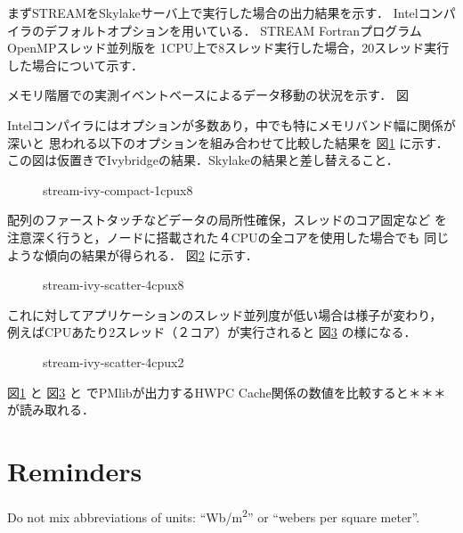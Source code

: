 \documentclass[conference]{IEEEtran}
\begin{document}
まずSTREAMをSkylakeサーバ上で実行した場合の出力結果を示す．
Intelコンパイラのデフォルトオプションを用いている．
STREAM FortranプログラムOpenMPスレッド並列版を
1CPU上で8スレッド実行した場合，20スレッド実行した場合について示す．

メモリ階層での実測イベントベースによるデータ移動の状況を示す．
図


Intelコンパイラにはオプションが多数あり，中でも特にメモリバンド幅に関係が深いと
思われる以下のオプションを組み合わせて比較した結果を
図\ref{fig:stream-ivy-compact-1cpux8} に示す．\\
{\color{blue}この図は仮置きでIvybridgeの結果．Skylakeの結果と差し替えること．}

\begin{figure}[bt]
\centering
\caption{stream-ivy-compact-1cpux8}
\label{fig:stream-ivy-compact-1cpux8}
\end{figure}


配列のファーストタッチなどデータの局所性確保，スレッドのコア固定など
を注意深く行うと，ノードに搭載された４CPUの全コアを使用した場合でも
同じような傾向の結果が得られる．
図\ref{fig:stream-ivy-scatter-4cpux8} に示す．\\

\begin{figure}[bt]
\centering
\caption{stream-ivy-scatter-4cpux8}
\label{fig:stream-ivy-scatter-4cpux8}
\end{figure}

これに対してアプリケーションのスレッド並列度が低い場合は様子が変わり，
例えばCPUあたり2スレッド（２コア）が実行されると
図\ref{fig:stream-ivy-scatter-4cpux2} の様になる．\\

\begin{figure}[bt]
\centering
\caption{stream-ivy-scatter-4cpux2}
\label{fig:stream-ivy-scatter-4cpux2}
\end{figure}

図\ref{fig:stream-ivy-compact-1cpux8} と
図\ref{fig:stream-ivy-scatter-4cpux2} と
でPMlibが出力するHWPC Cache関係の数値を比較すると＊＊＊
が読み取れる．



\section{Reminders}
Do not mix abbreviations of units: ``Wb/m\textsuperscript{2}'' or ``webers per square meter''.
\end{document}
